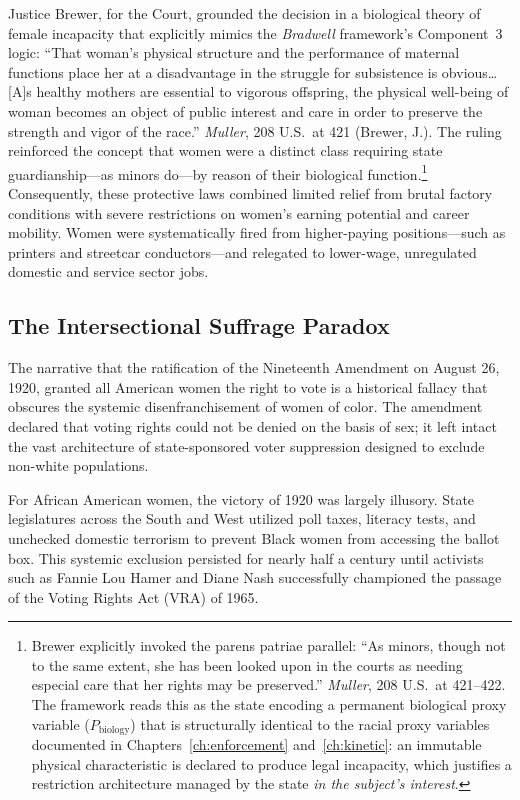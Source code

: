 Justice Brewer, for the Court, grounded the decision in a biological theory of female incapacity that explicitly mimics the \textit{Bradwell} framework’s Component~3 logic: ``That woman’s physical structure and the performance of maternal functions place her at a disadvantage in the struggle for subsistence is obvious\ldots [A]s healthy mothers are essential to vigorous offspring, the physical well-being of woman becomes an object of public interest and care in order to preserve the strength and vigor of the race.'' \textit{Muller}, 208 U.S.\ at 421 (Brewer, J.). The ruling reinforced the concept that women were a distinct class requiring state guardianship---as minors do---by reason of their biological function.\footnote{Brewer explicitly invoked the parens patriae parallel: ``As minors, though not to the same extent, she has been looked upon in the courts as needing especial care that her rights may be preserved.'' \textit{Muller}, 208 U.S.\ at 421--422. The framework reads this as the state encoding a permanent biological proxy variable ($P_{\text{biology}}$) that is structurally identical to the racial proxy variables documented in Chapters~\ref{ch:enforcement} and~\ref{ch:kinetic}: an immutable physical characteristic is declared to produce legal incapacity, which justifies a restriction architecture managed by the state \textit{in the subject’s interest}.} Consequently, these protective laws combined limited relief from brutal factory conditions with severe restrictions on women’s earning potential and career mobility. Women were systematically fired from higher-paying positions---such as printers and streetcar conductors---and relegated to lower-wage, unregulated domestic and service sector jobs.

\subsection{The Intersectional Suffrage Paradox}

The narrative that the ratification of the Nineteenth Amendment on August 26, 1920, granted all American women the right to vote is a historical fallacy that obscures the systemic disenfranchisement of women of color. The amendment declared that voting rights could not be denied on the basis of sex; it left intact the vast architecture of state-sponsored voter suppression designed to exclude non-white populations.

For African American women, the victory of 1920 was largely illusory. State legislatures across the South and West utilized poll taxes, literacy tests, and unchecked domestic terrorism to prevent Black women from accessing the ballot box. This systemic exclusion persisted for nearly half a century until activists such as Fannie Lou Hamer and Diane Nash successfully championed the passage of the Voting Rights Act (VRA) of 1965.

